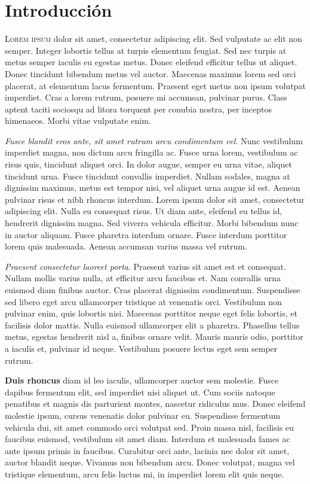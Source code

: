\chapter*{Introducción}



\noindent\textsc{Lorem ipsum} dolor sit amet, consectetur adipiscing elit. Sed vulputate ac elit non semper. Integer lobortis tellus at turpis elementum feugiat. Sed nec turpis at metus semper iaculis eu egestas metus. Donec eleifend efficitur tellus ut aliquet. Donec tincidunt bibendum metus vel auctor. Maecenas maximus lorem sed orci placerat, at elementum lacus fermentum. Praesent eget metus non ipsum volutpat imperdiet. Cras a lorem rutrum, posuere mi accumsan, pulvinar purus. Class aptent taciti sociosqu ad litora torquent per conubia nostra, per inceptos himenaeos. Morbi vitae vulputate enim.

\emph{Fusce blandit eros ante, sit amet rutrum arcu condimentum vel}. Nunc vestibulum imperdiet magna, non dictum arcu fringilla ac. Fusce urna lorem, vestibulum ac risus quis, tincidunt aliquet orci. In dolor augue, semper eu urna vitae, aliquet tincidunt urna. Fusce tincidunt convallis imperdiet. Nullam sodales, magna at dignissim maximus, metus est tempor nisi, vel aliquet urna augue id est. Aenean pulvinar risus et nibh rhoncus interdum. Lorem ipsum dolor sit amet, consectetur adipiscing elit. Nulla eu consequat risus. Ut diam ante, eleifend eu tellus id, hendrerit dignissim magna. Sed viverra vehicula efficitur. Morbi bibendum nunc in auctor aliquam. Fusce pharetra interdum ornare. Fusce interdum porttitor lorem quis malesuada. Aenean accumsan varius massa vel rutrum.

\textit{Praesent consectetur laoreet porta}. Praesent varius sit amet est et consequat. Nullam mollis varius nulla, at efficitur arcu faucibus et. Nam convallis urna euismod diam finibus auctor. Cras placerat dignissim condimentum. Suspendisse sed libero eget arcu ullamcorper tristique at venenatis orci. Vestibulum non pulvinar enim, quis lobortis nisi. Maecenas porttitor neque eget felis lobortis, et facilisis dolor mattis. Nulla euismod ullamcorper elit a pharetra. Phasellus tellus metus, egestas hendrerit nisl a, finibus ornare velit. Mauris mauris odio, porttitor a iaculis et, pulvinar id neque. Vestibulum posuere lectus eget sem semper rutrum.

\textbf{Duis rhoncus} diam id leo iaculis, ullamcorper auctor sem molestie. Fusce dapibus fermentum elit, sed imperdiet nisi aliquet ut. Cum sociis natoque penatibus et magnis dis parturient montes, nascetur ridiculus mus. Donec eleifend molestie ipsum, cursus venenatis dolor pulvinar eu. Suspendisse fermentum vehicula dui, sit amet commodo orci volutpat sed. Proin massa nisl, facilisis eu faucibus euismod, vestibulum sit amet diam. Interdum et malesuada fames ac ante ipsum primis in faucibus. Curabitur orci ante, lacinia nec dolor sit amet, auctor blandit neque. Vivamus non bibendum arcu. Donec volutpat, magna vel tristique elementum, arcu felis luctus mi, in imperdiet lorem elit quis neque.

